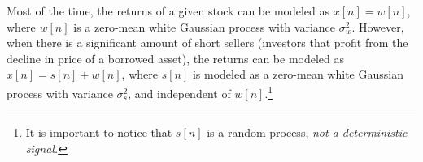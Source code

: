 \question[25]  %



Most of the time, the returns of a given stock can be modeled as $x[n] = w[n]$, where $w[n]$ is a zero-mean white Gaussian process with variance $\sigma_w^2$. However, when there is a significant amount of short sellers (investors that profit from the decline in price of a borrowed asset), the returns can be modeled as $x[n] = s[n] + w[n]$, where $s[n]$ is modeled as a zero-mean white Gaussian process with variance $\sigma_s^2$, and independent of $w[n]$.\footnote{It is important to notice that $s[n]$ is a random process, \emph{not a deterministic signal.}}

